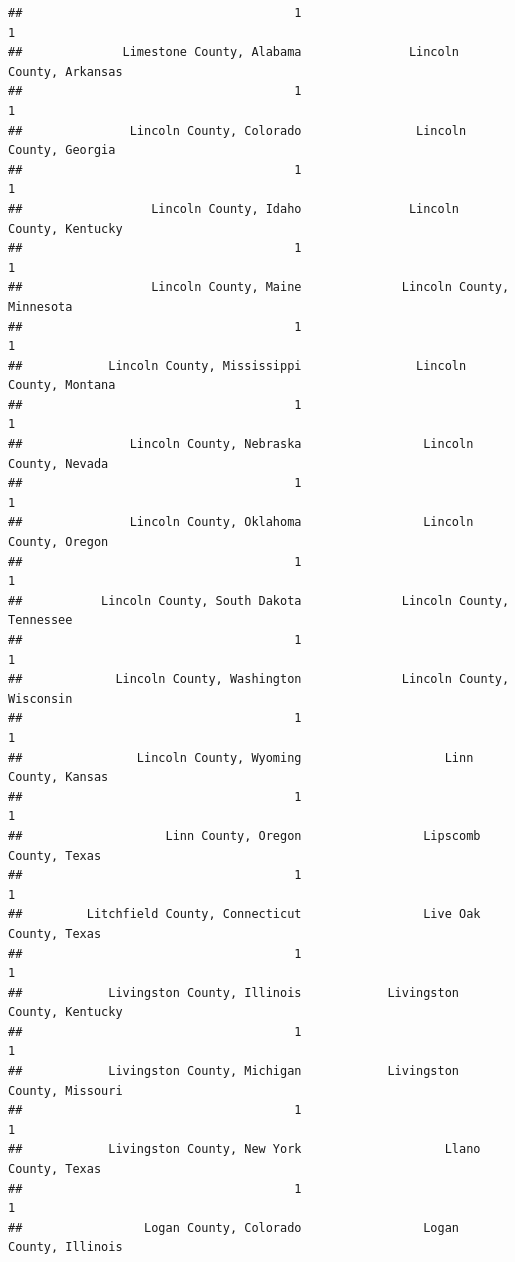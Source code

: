 \documentclass[
]{article}
\begin{document}
\begin{verbatim}
##                                      1                                      1 
##              Limestone County, Alabama               Lincoln County, Arkansas 
##                                      1                                      1 
##               Lincoln County, Colorado                Lincoln County, Georgia 
##                                      1                                      1 
##                  Lincoln County, Idaho               Lincoln County, Kentucky 
##                                      1                                      1 
##                  Lincoln County, Maine              Lincoln County, Minnesota 
##                                      1                                      1 
##            Lincoln County, Mississippi                Lincoln County, Montana 
##                                      1                                      1 
##               Lincoln County, Nebraska                 Lincoln County, Nevada 
##                                      1                                      1 
##               Lincoln County, Oklahoma                 Lincoln County, Oregon 
##                                      1                                      1 
##           Lincoln County, South Dakota              Lincoln County, Tennessee 
##                                      1                                      1 
##             Lincoln County, Washington              Lincoln County, Wisconsin 
##                                      1                                      1 
##                Lincoln County, Wyoming                    Linn County, Kansas 
##                                      1                                      1 
##                    Linn County, Oregon                 Lipscomb County, Texas 
##                                      1                                      1 
##         Litchfield County, Connecticut                 Live Oak County, Texas 
##                                      1                                      1 
##            Livingston County, Illinois            Livingston County, Kentucky 
##                                      1                                      1 
##            Livingston County, Michigan            Livingston County, Missouri 
##                                      1                                      1 
##            Livingston County, New York                    Llano County, Texas 
##                                      1                                      1 
##                 Logan County, Colorado                 Logan County, Illinois 

\end{verbatim}
\end{document}
